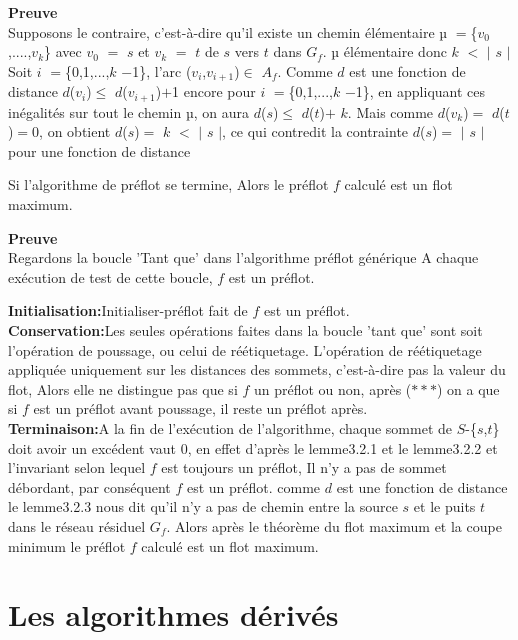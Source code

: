 \textbf{Preuve} \\
Supposons le contraire, c'est-à-dire qu'il existe un chemin élémentaire $µ$ $=$\{$v_0$,....,$v_k$\} avec $v_0$ $=$ $s$ et $v_k$ $=$ $t$ de $s$ vers $t$ dans $G_f$.
$µ$ élémentaire donc $k$ $<$ $|$ $s$ $|$
Soit $i$ $=$\{0,1,...,$k$ $-$1\}, l'arc ($v_i$,$v_{i+1}$)$\in$ $A_f$. Comme $d$ est une fonction de distance $d$($v_i$)$\leq$ $d$($v_{i+1}$)$+$1 encore pour $i$ $=$\{0,1,...,$k$ $-$1\}, en appliquant ces inégalités sur tout le chemin $µ$, on aura
$d$($s$)$\leq$ $d$($t$)$+$ $k$. Mais comme $d$($v_k$)$=$ $d$($t$)$=$0, on obtient 
$d$($s$)$=$ $k$ $<$ $|$ $s$ $|$, ce qui contredit la contrainte $d$($s$)$=$ $|$ $s$ $|$ pour une fonction de distance \\

\begin{thrm}
Si l'algorithme de préflot se termine, Alors le préflot $f$ calculé est un flot maximum.
\end{thrm}

\textbf{Preuve} \\
 Regardons la boucle 'Tant que' dans l'algorithme préflot générique A chaque exécution de test de cette boucle, $f$ est un préflot.
 
 \textbf{Initialisation:}Initialiser-préflot fait de $f$ est un préflot.\\ 
 
 \textbf{Conservation:}Les seules opérations faites dans la boucle 'tant que' sont soit l'opération de poussage, ou celui de réétiquetage.  
 L'opération de réétiquetage appliquée uniquement sur les distances des sommets, c'est-à-dire pas la valeur du flot, Alors elle ne distingue pas que si $f$ un préflot ou non, après ($***$) on a que si $f$ est un préflot avant poussage, il reste un préflot après.\\

 
 \textbf{Terminaison:}A la fin de l'exécution de l'algorithme, chaque sommet de
$S$-\{$s$,$t$\} doit avoir un excédent vaut 0, en effet d'après le lemme3.2.1 et le lemme3.2.2 et l'invariant selon lequel $f$ est toujours un préflot, Il n'y a pas de sommet débordant, par conséquent $f$ est un préflot. comme $d$ est une fonction de distance le lemme3.2.3 nous dit qu'il n'y a pas de chemin entre la source $s$ et le puits $t$ dans le réseau résiduel $G_f$.
 Alors après le théorème du flot maximum et la coupe minimum le préflot $f$ calculé est un flot maximum.  


\section{Les algorithmes dérivés}

